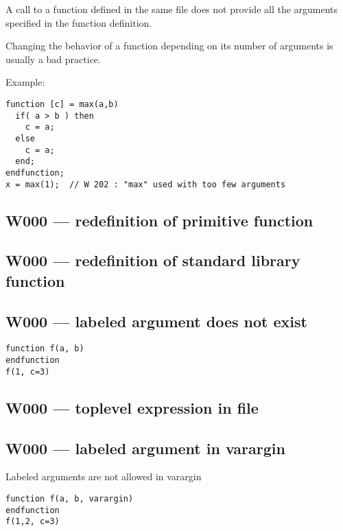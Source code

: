 A call to a function defined in the same file does not provide all the
arguments specified in the function definition.



Changing the behavior of a function depending on its number of
arguments is usually a bad practice.



Example:\begin{verbatim}
function [c] = max(a,b)
  if( a > b ) then
    c = a;
  else
    c = a;
  end;
endfunction;
x = max(1);  // W 202 : "max" used with too few arguments
\end{verbatim}




\subsection{W000 --- redefinition of primitive function}




\subsection{W000 --- redefinition of standard library function}




\subsection{W000 --- labeled argument does not exist}


\begin{verbatim}
function f(a, b)
endfunction
f(1, c=3)
\end{verbatim}


\subsection{W000 --- toplevel expression in file}




\subsection{W000 --- labeled argument in varargin}




Labeled arguments are not allowed in varargin

\begin{verbatim}
function f(a, b, varargin)
endfunction
f(1,2, c=3)
\end{verbatim}


